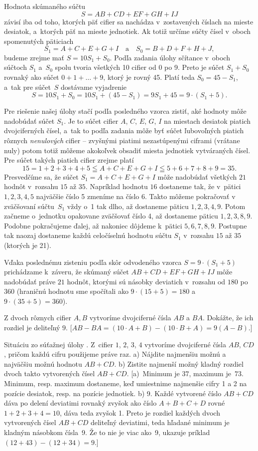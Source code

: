 {%
Hodnota skúmaného súčtu
$$
S=AB+CD+EF+GH+IJ
$$
závisí iba od toho, ktorých päť cifier sa nachádza v~zostavených
číslach na mieste desiatok, a~ktorých päť na mieste jednotiek.
Ak totiž určíme súčty čísel v~oboch spomenutých päticiach
$$
S_1=A+C+E+G+I\quad\text{a}\quad S_0=B+D+F+H+J,
$$
budeme zrejme mať $S=10S_1+S_0$. Podľa zadania úlohy sčítance
v~oboch súčtoch $S_1$ a~$S_0$ spolu tvoria všetkých 10
cifier od 0 po 9. Preto je súčet $S_1+S_0$ rovnaký ako súčet
$0+1+\dots+9$, ktorý je rovný 45. Platí teda $S_0=45-S_1$,
a~tak pre súčet~$S$ dostávame vyjadrenie
$$
S=10S_1+S_0=10S_1+(45-S_1)=9S_1+45=9\cdot(S_1+5).
$$

Pre riešenie našej úlohy stačí podľa posledného vzorca zistiť,
aké hodnoty môže nadobúdať súčet $S_1$. Je to súčet
cifier $A$, $C$, $E$, $G$, $I$ na miestach desiatok piatich dvojciferných čísel,
a~tak to podľa zadania môže byť súčet ľubovoľných piatich rôznych
{\it nenulových\/}
cifier -- zvyšnými piatimi nezastúpenými ciframi (vrátane nuly) potom
totiž môžeme akokoľvek obsadiť miesta jednotiek vytváraných čísel.
Pre súčet takých piatich cifier zrejme platí
$$
15 = 1+2+3+4+5 \leqq A+C+E+G+I \leqq 5+6+7+8+9 = 35.
$$
Presvedčíme sa, že súčet $S_1=A+C+E+G+I$ môže nadobúdať všetkých $21$
hodnôt v~rozsahu $15$ až $35$. Napríklad hodnotu $16$ dostaneme tak, že
v~pätici $1,2,3,4,5$ najväčšie číslo 5 zmeníme na číslo $6$. Takto môžeme
pokračovať v zväčšovaní súčtu~$S_1$ vždy o~1 tak dlho,
až dostaneme päticu $1,2,3,4,9$. Potom začneme o~jednotku opakovane
zväčšovať číslo 4, až dostaneme
päticu $1,2,3,8,9$. Podobne pokračujeme ďalej, až nakoniec dôjdeme k~pätici
$5,6,7,8,9$. Postupne tak naozaj dostaneme každú
celočíselnú hodnotu súčtu $S_1$ v~rozsahu $15$ až $35$ (ktorých
je 21).

Vďaka poslednému zisteniu podľa skôr odvodeného vzorca $S=9\cdot(S_1+5)$
prichádzame k~záveru, že skúmaný súčet $AB+CD+EF+GH+IJ$ môže nadobúdať
práve $21$ hodnôt, ktorými sú násobky deviatich v~rozsahu od
$180$ po $360$ (hraničnú hodnotu sme spočítali ako $9\cdot(15+5)=180$
a~$9\cdot(35+5)=360$).

Z dvoch rôznych cifier $A, B$ vytvoríme
dvojciferné čísla $AB$ a $BA$. Dokážte, že ich rozdiel je
deliteľný $9$.
[$AB-BA=(10\cdot A+B)-(10\cdot B+A)=9(A-B)$.]

Situáciu zo súťažnej úlohy . Z~cifier $1$, $2$, $3$,
$4$ vytvoríme dvojciferné čísla $AB$, $CD$, pričom každú
cifru použijeme práve raz.\hfill\break
a) Nájdite najmenšiu možnú a najväčšiu možnú hodnotu $AB+CD$.\hfill\break
b) Zistite najmenší možný kladný rozdiel dvoch takto vytvorených
čísel $AB+CD$.\hfill{}
[a)~Minimum je $37$, maximum je~$73$. Minimum, resp. maximum
dostaneme, keď umiestnime najmenšie cifry 1 a 2 na pozície
desiatok, resp. na pozície jednotiek. b) 9. Každé vytvorené číslo
$AB+CD$ dáva po delení deviatimi rovnaký zvyšok ako číslo $A+B+C+D$
rovné $1+2+3+4=10$, dáva teda zvyšok 1. Preto je rozdiel každých dvoch
vytvorených čísel $AB+CD$ deliteľný deviatimi, teda hľadané minimum
je kladným násobkom čísla~9. Že to nie je viac ako~9,
ukazuje príklad $(12+43)-(12+34)=9$.]

}
